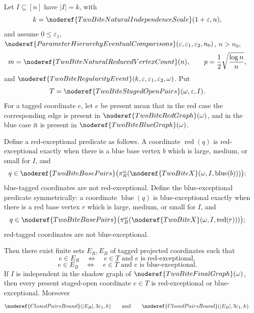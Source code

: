 \begin{helper}
Let \(I\subseteq[n]\) have \(|I|=k\), with
\[
k=\noderef{TwoBiteNaturalIndependenceScale}(1+\varepsilon,n),
\]
and assume \(0\le\varepsilon_1\),
\(\noderef{ParameterHierarchyEventualComparisons}
(\varepsilon,\varepsilon_1,\varepsilon_2,n_0)\), \(n>n_0\),
\[
m=\noderef{TwoBiteNaturalReducedVertexCount}(n),\qquad
p=\frac12\sqrt{\frac{\log n}{n}},
\]
and
\(\noderef{TwoBiteRegularityEvent}(k,\varepsilon,\varepsilon_1,\varepsilon_2,
\omega)\).  Put
\[
T=\noderef{TwoBiteStagedOpenPairs}(\omega,\varepsilon,I).
\]
For a tagged coordinate \(e\), let \(e\) be present mean that in the red case
the corresponding edge is present in \(\noderef{TwoBiteRedGraph}(\omega)\),
and in the blue case it is present in
\(\noderef{TwoBiteBlueGraph}(\omega)\).

Define a red-exceptional predicate as follows.  A coordinate
\(\operatorname{red}(q)\) is red-exceptional exactly when there is a blue base
vertex \(b\) which is large, medium, or small for \(I\), and
\[
q\in\noderef{TwoBiteBasePairs}
\bigl(\pi_R^\omega(\noderef{TwoBiteX}(\omega,I,\operatorname{blue}(b)))\bigr);
\]
blue-tagged coordinates are not red-exceptional.  Define the
blue-exceptional predicate symmetrically: a coordinate
\(\operatorname{blue}(q)\) is blue-exceptional exactly when there is a red base
vertex \(r\) which is large, medium, or small for \(I\), and
\[
q\in\noderef{TwoBiteBasePairs}
\bigl(\pi_B^\omega(\noderef{TwoBiteX}(\omega,I,\operatorname{red}(r)))\bigr);
\]
red-tagged coordinates are not blue-exceptional.

Then there exist finite sets \(E_R,E_B\) of tagged projected coordinates such
that
\[
e\in E_R\quad\Longleftrightarrow\quad e\in T
\text{ and }e\text{ is red-exceptional},
\]
\[
e\in E_B\quad\Longleftrightarrow\quad e\in T
\text{ and }e\text{ is blue-exceptional}.
\]
If \(I\) is independent in the shadow graph of
\(\noderef{TwoBiteFinalGraph}(\omega)\), then every present
staged-open coordinate \(e\in T\) is red-exceptional or blue-exceptional.
Moreover
\[
\noderef{ClosedPairsBound}(|E_R|,3\varepsilon_1,k)
\qquad\text{and}\qquad
\noderef{ClosedPairsBound}(|E_B|,3\varepsilon_1,k).
\]
\end{helper}
